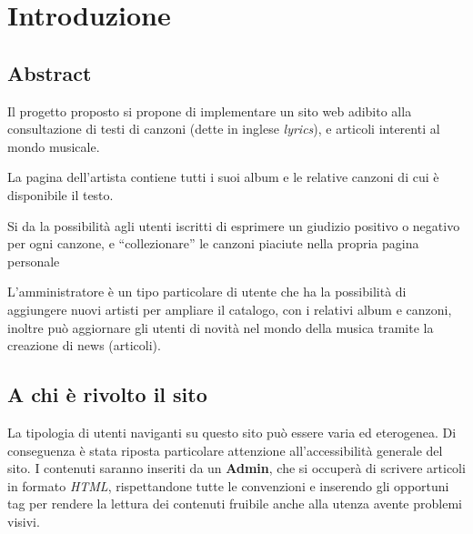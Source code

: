 \section{Introduzione}

\subsection{Abstract}
Il progetto proposto si propone di implementare un sito web adibito alla consultazione di testi di canzoni (dette in inglese \textit{lyrics}), e articoli interenti al mondo musicale.

La pagina dell'artista contiene tutti i suoi album e le relative canzoni di cui è disponibile il testo.

Si da la possibilità agli utenti iscritti di esprimere un giudizio positivo o negativo per ogni canzone, e ``collezionare'' le canzoni piaciute nella propria pagina personale

L'amministratore è un tipo particolare di utente che ha la possibilità di aggiungere nuovi artisti per ampliare il catalogo, con i relativi album e canzoni, inoltre può aggiornare gli utenti di novità nel mondo della musica tramite la creazione di news (articoli).


\subsection{A chi è rivolto il sito}
La tipologia di utenti naviganti su questo sito può essere varia ed eterogenea. Di conseguenza è stata riposta particolare attenzione all'accessibilità generale del sito. I contenuti saranno inseriti da un \textbf{Admin}, che si occuperà di scrivere articoli in formato \textit{HTML}, rispettandone tutte le convenzioni e inserendo gli opportuni tag per rendere la lettura dei contenuti fruibile anche alla utenza avente problemi visivi.
